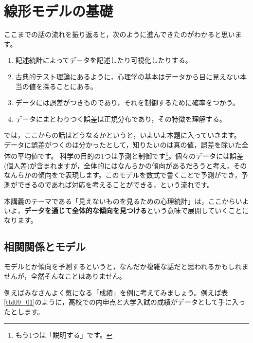 \documentclass{ltjbook}
\begin{document}
 
\chapter{線形モデルの基礎} 
\label{chapter9} 

ここまでの話の流れを振り返ると，次のように進んできたのがわかると思います。
\begin{enumerate}
    \item 記述統計によってデータを記述したり可視化したりする。
    \item 古典的テスト理論にあるように，心理学の基本はデータから目に見えない本当の値を探ることにある。
    \item データには誤差がつきものであり，それを制御するために確率をつかう。
    \item データにまとわりつく誤差は正規分布であり，その特徴を理解する。
\end{enumerate}

では，ここからの話はどうなるかというと，いよいよ本題に入っていきます。
データに誤差がつくのは分かったとして，知りたいのは真の値，誤差を除いた全体の平均値です。
科学の目的の1つは予測と制御です\footnote{もう1つは「説明する」です。}。個々のデータには誤差(個人差)が含まれますが，全体的にはなんらかの傾向があるだろうと考え，そのなんらかの傾向をで表現します。このモデルを数式で書くことで予測ができ，予測ができるのであれば対応を考えることができる，という流れです。

本講義のテーマである「見えないものを見るための心理統計」は，ここからいよいよ，\textbf{データを通じて全体的な傾向を見つける}という意味で展開していくことになります。

\section{相関関係とモデル}
モデルとか傾向を予測するというと，なんだか複雑な話だと思われるかもしれませんが，全然そんなことはありません。

例えばみなさんよく気になる「成績」を例に考えてみましょう。例えば表\ref{tbl09_01}のように，高校での内申点と大学入試の成績がデータとして手に入ったとします。
\end{document}
